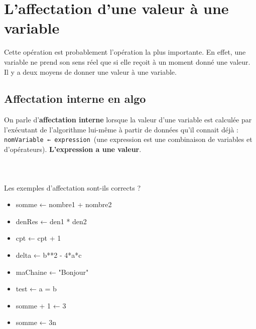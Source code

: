 \documentclass[11pt,a4paper]{article}
\begin{document}
        \section{L'affectation d'une valeur \`a une variable}
				Cette op\'eration est probablement l'op\'eration la plus importante. En effet, une variable ne
        prend son sens r\'eel que si elle re\c coit \`a un moment donn\'e une valeur. Il y a deux moyens de
        donner une valeur \`a une variable.
      
            \par
        \subsection{Affectation interne en algo}
          On parle d'\textbf{affectation interne} lorsque la valeur d'une variable est \guillemotleft  calcul\'ee \guillemotright  par l'ex\'ecutant
          de l'algorithme lui-m\^eme \`a partir de donn\'ees qu'il connait d\'ej\`a :
          \,\verb|nomVariable ← expression|\,
          (une expression est une combinaison de variables et d'op\'erateurs). \textbf{L'expression a une valeur}.
        
            \par
        
			
		\subparagraph{} 
		
                \textcolor{white}{.} \par
            Les exemples d'affectation sont-ils corrects ?
						
            \begin{itemize} 
        
            \item[ \ding{"6F} ] somme ← nombre1 + nombre2
        
            \item[ \ding{"6F} ] denRes ← den1 * den2
        
            \item[ \ding{"6F} ] cpt ← cpt + 1
        
            \item[ \ding{"6F} ] delta ← b**2 - 4*a*c
        
            \item[ \ding{"6F} ] maChaine ← "Bonjour"
        
            \item[ \ding{"6F} ] test ← a = b
        
            \item[ \ding{"6F} ] somme + 1 ← 3
        
            \item[ \ding{"6F} ] somme ← 3n
        
            \end{itemize} 
        
\end{document}
